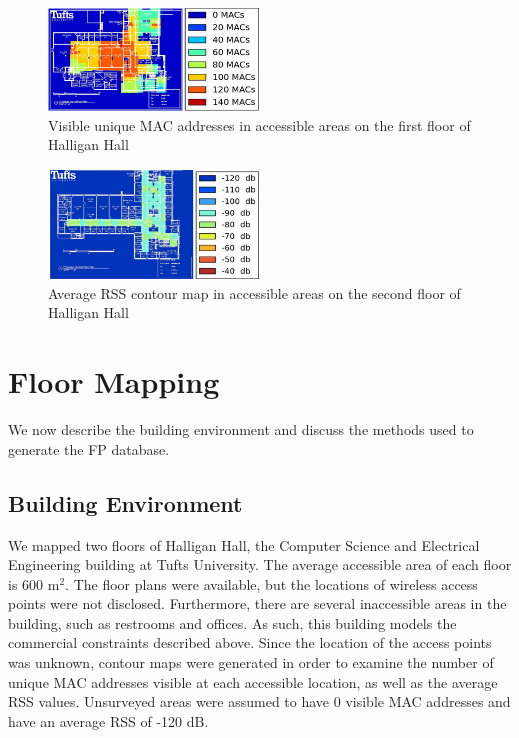 \documentclass[conference]{IEEEtran}
\begin{document}
\begin{figure}[t!]
  \centering
    \includegraphics[width=0.5\textwidth]{APContour}
    \caption{Visible unique MAC addresses in accessible areas on the first floor of Halligan Hall}
    \label{fig:visible_unique_macs}
\end{figure}


\begin{figure}[t!]
  \centering
    \includegraphics[width=0.5\textwidth]{dbContour}
   \caption{Average RSS contour map in accessible areas on the second floor of Halligan Hall}
   \label{fig:rss_contour_map}
\end{figure}

\section{Floor Mapping}
We now describe the building environment and discuss the methods used to generate the FP database.
\subsection{Building Environment}
We mapped two floors of Halligan Hall, the Computer Science and Electrical Engineering building at Tufts University. The average accessible area of each floor is 600 m$^2$. The floor plans were available, but the locations of wireless access points were not disclosed. Furthermore, there are several inaccessible areas in the building, such as restrooms and offices. As such, this building models the commercial constraints described above. Since the location of the access points was unknown, contour maps were generated in order to examine the number of unique MAC addresses visible at each accessible location, as well as the average RSS values. Unsurveyed areas were assumed to have 0 visible MAC addresses and have an average RSS of -120 dB. 
\end{document}
